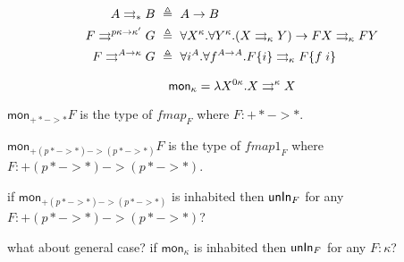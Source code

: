 \begin{align*}
A \rightrightarrows_{*} B &~\triangleq~ A -> B \\
F \rightrightarrows^{p\kappa -> \kappa'} G &~\triangleq~
        \forall X^\kappa.\forall Y^\kappa.
                (X \rightrightarrows_\kappa Y) -> F X \rightrightarrows_\kappa F Y \\
F \rightrightarrows^{A -> \kappa} G &~\triangleq~
        \forall i^A.\forall f^{A->A}. F\{i\} \rightrightarrows_\kappa F\{f\;i\}
\end{align*}

\[
\textsf{mon}_\kappa
  = \lambda X^{0\kappa}.X \rightrightarrows^\kappa X
\]

$\textsf{mon}_{+* -> *} F$ is the type of $\textit{fmap}_F$
where $F : +* -> *$.

$\textsf{mon}_{+(p* -> *)->(p* -> *)} F$ is the type of $\textit{fmap1}_F$
where $F : +(p* -> *)->(p* -> *)$.

if $\textsf{mon}_{+(p* -> *)->(p* -> *)}$ is inhabited
then $\mathsf{unIn}_F$ for any $F : +(p* -> *)->(p* -> *)$?

what about general case? if $\textsf{mon}_\kappa$ is inhabited
then $\mathsf{unIn}_F$ for any $F : \kappa$?

